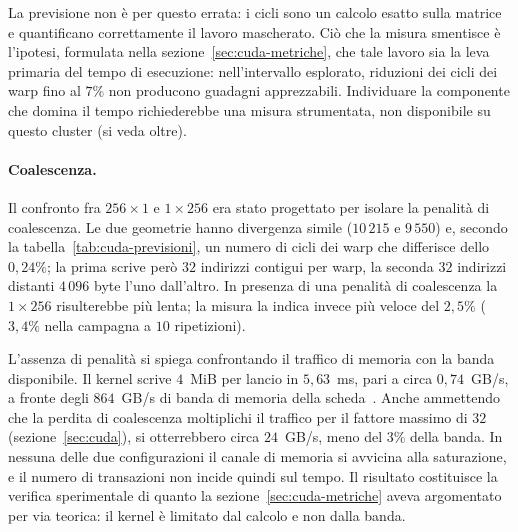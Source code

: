 La previsione non è per questo errata: i cicli sono un calcolo esatto sulla
matrice e quantificano correttamente il lavoro mascherato. Ciò che la misura
smentisce è
l'ipotesi, formulata nella sezione~\ref{sec:cuda-metriche}, che tale lavoro sia la
leva primaria del tempo di esecuzione: nell'intervallo esplorato, riduzioni dei
cicli dei warp fino al $7\%$ non producono guadagni apprezzabili. Individuare la
componente che domina il tempo richiederebbe una misura strumentata, non
disponibile su questo cluster (si veda oltre).

\paragraph{Coalescenza.}
Il confronto fra $256{\times}1$ e $1{\times}256$ era stato progettato per isolare
la penalità di coalescenza. Le due geometrie hanno divergenza simile ($10\,215$ e
$9\,550$) e, secondo la tabella~\ref{tab:cuda-previsioni}, un numero di cicli dei warp che
differisce dello $0{,}24\%$; la prima scrive però $32$ indirizzi contigui per
warp, la seconda $32$ indirizzi distanti $4\,096$ byte l'uno dall'altro. In
presenza di una penalità di coalescenza la $1{\times}256$ risulterebbe più lenta;
la misura la indica invece più veloce del $2{,}5\%$ ($3{,}4\%$ nella campagna a
$10$ ripetizioni).

L'assenza di penalità si spiega confrontando il traffico di memoria con la banda
disponibile. Il kernel scrive $4$~MiB per lancio in $5{,}63$~ms, pari a circa
$0{,}74$~GB/s, a fronte degli $864$~GB/s di banda di memoria della
scheda~\cite{nvidia_ada_arch}. Anche
ammettendo che la perdita di coalescenza moltiplichi il traffico per il fattore
massimo di $32$ (sezione~\ref{sec:cuda}), si otterrebbero circa $24$~GB/s, meno
del $3\%$ della banda. In nessuna delle due configurazioni il canale di memoria si
avvicina alla saturazione, e il numero di transazioni non incide quindi sul tempo.
Il risultato costituisce la verifica sperimentale di quanto la
sezione~\ref{sec:cuda-metriche} aveva argomentato per via teorica: il kernel è
limitato dal calcolo e non dalla banda.

